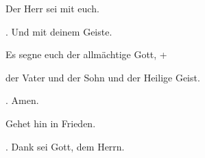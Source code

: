 Der Herr sei mit euch.

\Rbar. Und mit deinem Geiste.

Es segne euch der allmächtige Gott, + \par der Vater und der Sohn und der Heilige Geist.

\Rbar. Amen.

Gehet hin in Frieden.

\Rbar. Dank sei Gott, dem Herrn.
